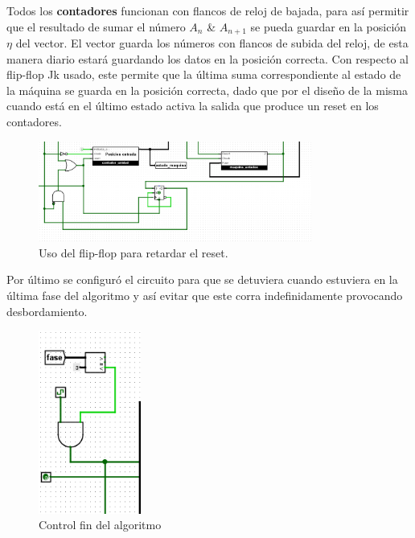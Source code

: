 \documentclass{article}
\begin{document}
Todos los \textbf{contadores} funcionan con flancos de reloj de bajada, para así permitir que el resultado 
de sumar el número $A_n$ \& $A_{n+1}$ se pueda guardar en la posición $\eta$ del vector.
El vector guarda los números con flancos de subida del reloj, de esta manera diario estará guardando los 
datos en la posición correcta.
Con respecto al flip-flop Jk usado, este permite que la última suma correspondiente al estado de la máquina 
se guarda en la posición correcta, dado que por el diseño de la misma cuando está en el último estado activa
la salida que produce un reset en los contadores.
\newpage
\begin{figure}[h] %
    \centering
    \includegraphics[width=0.8\textwidth]{imagenes/ultimo_ciclo.png} %
    \caption{Uso del flip-flop para retardar el reset.} %
    \label{fig:ultimociclo} %
\end{figure}

Por último se configuró el circuito para que se detuviera cuando estuviera en la última fase del algoritmo
y así evitar que este corra indefinidamente provocando desbordamiento.
\begin{figure}[h] %
    \centering
    \includegraphics[width=0.3\textwidth]{imagenes/control.png} %
    \caption{Control fin del algoritmo} %
    \label{fig:control} %
\end{figure}
\newpage
\end{document}
